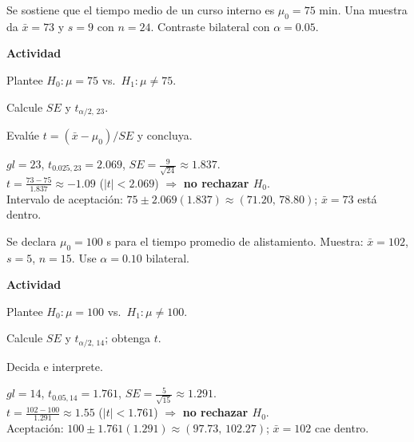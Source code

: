 \begin{ejercicio}[Tiempo de capacitación técnica (n=24)]
Se sostiene que el tiempo medio de un curso interno es $\mu_0=75$ min. Una muestra da
$\bar{x}=73$ y $s=9$ con $n=24$. Contraste bilateral con $\alpha=0.05$.


\textbf{Actividad}
\begin{pasos}
  \item Plantee $H_0:\mu=75$ vs.\ $H_1:\mu\neq75$.
  \item Calcule $SE$ y $t_{\alpha/2,\,23}$.
  \item Evalúe $t=(\bar{x}-\mu_0)/SE$ y concluya.
\end{pasos}

\begin{clave}
$gl=23$, \; $t_{0.025,23}=2.069$, \;
$SE=\tfrac{9}{\sqrt{24}}\approx 1.837$.\\
$t=\frac{73-75}{1.837}\approx -1.09$ \; ($|t|<2.069$) $\Rightarrow$ \textbf{no rechazar $H_0$}.\\
Intervalo de aceptación: $75\pm 2.069(1.837)\approx (71.20,\,78.80)$; $\bar{x}=73$ está dentro.
\end{clave}
\end{ejercicio}


\begin{ejercicio}[Tiempo de alistamiento de célula (n=15)]
Se declara $\mu_0=100$ s para el tiempo promedio de alistamiento. Muestra: $\bar{x}=102$, $s=5$, $n=15$.
Use $\alpha=0.10$ bilateral.


\textbf{Actividad}
\begin{pasos}
  \item Plantee $H_0:\mu=100$ vs.\ $H_1:\mu\neq100$.
  \item Calcule $SE$ y $t_{\alpha/2,\,14}$; obtenga $t$.
  \item Decida e interprete.
\end{pasos}

\begin{clave}
$gl=14$, \; $t_{0.05,14}=1.761$, \;
$SE=\tfrac{5}{\sqrt{15}}\approx 1.291$.\\
$t=\frac{102-100}{1.291}\approx 1.55$ \; ($|t|<1.761$) $\Rightarrow$ \textbf{no rechazar $H_0$}.\\
Aceptación: $100\pm 1.761(1.291)\approx (97.73,\,102.27)$; $\bar{x}=102$ cae dentro.
\end{clave}
\end{ejercicio}


